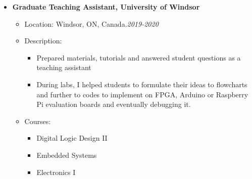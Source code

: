 \begin {itemize}
\begin {itemize}
\begin {itemize}
\begin {itemize}
                        \item [\textbullet] Closely supervising and mentoring four PhD and seven master students on weekly meeting basis.
                        \item [\textbullet] Helping them to gain fundamental knowledge, identifying problems, literature survey for solutions, and critical analysis of published works.
                        \item [\textbullet] PhD students have successfully published papers in IEEE transactions within their second year, with additional papers currently under review and in preparation
                        \item [\textbullet] Offered guidance and evaluate the progress of an undergraduate student as they completed their project.
                    \end {itemize}
            \end {itemize} \vspace{0.3cm}
     \item [$\bullet$] \bf {\mtf \normalsize  Graduate Teaching Assistant, University of Windsor} \mdseries
            \begin {itemize}
                \item [-]  {  Location: Windsor, ON, Canada.\small \hspace{5.7cm}\textit{2019-2020}\normalsize} 
                \item [-]   {   Description:} 
                    \begin {itemize}
                        \item [\textbullet]  Prepared materials, tutorials and answered student questions as a teaching assistant
                        \item [\textbullet]  During  labs, I 
helped students to formulate their ideas to flowcharts and further to codes to implement on FPGA, Arduino or Raspberry Pi evaluation boards
 and eventually debugging it.
                    \end {itemize}
                    \item [-]   {   Courses:} 
                    \begin {itemize}   
                        \item [\textbullet]  Digital Logic Design II
                        \item [\textbullet] Embedded Systems
                        \item [\textbullet] Electronics I

\end{itemize}
\end{itemize}
\end{itemize}
\end{itemize}
